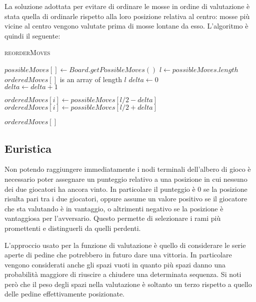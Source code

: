 \documentclass[a4paper]{article}
\begin{document}
La soluzione adottata per evitare di ordinare le mosse in ordine di valutazione
è stata quella di ordinarle rispetto alla loro posizione relativa al centro: 
mosse più vicine al centro vengono valutate prima di mosse lontane da esso.
L'algoritmo è quindi il seguente:

\begin{algorithm}
  \caption{\textsc{reorderMoves}}
 \begin{algorithmic}
   \State $possibleMoves[] \gets Board.getPossibleMoves()$
     \State $l \gets possibleMoves.length$
     \State $orderedMoves[]$ is an array of length $l$
     \State $delta \gets 0$
     \\
         \State $delta \gets delta + 1$

         \State $orderedMoves[i] \gets possibleMoves[l / 2 - delta]$
       \Else
         \State $orderedMoves[i] \gets possibleMoves[l / 2 + delta]$
       \EndIf
     \EndFor

     \State \Return $orderedMoves[]$
   \EndFunction
 \end{algorithmic} 
\end{algorithm}

\subsection{Euristica}
Non potendo raggiungere immediatamente i nodi terminali dell'albero di gioco è
necessario poter assegnare un punteggio relativo a una posizione in cui nessuno
dei due giocatori ha ancora vinto. In particolare il punteggio è 0 se la 
posizione risulta pari tra i due giocatori, oppure assume un valore positivo se
il giocatore che sta valutando è in vantaggio, o altrimenti negativo se la 
posizione è vantaggiosa per l'avversario. Questo permette di selezionare i rami
più promettenti e distinguerli da quelli perdenti.

L'approccio usato per la funzione di valutazione è quello di considerare 
le serie aperte di pedine che potrebbero in futuro dare una vittoria. In 
particolare vengono considerati anche gli spazi vuoti in quanto più spazi danno
una probabilità maggiore di riuscire a chiudere una determinata sequenza. Si 
noti però che il peso degli spazi nella valutazione è soltanto un terzo rispetto
a quello delle pedine effettivamente posizionate.
\end{document}
